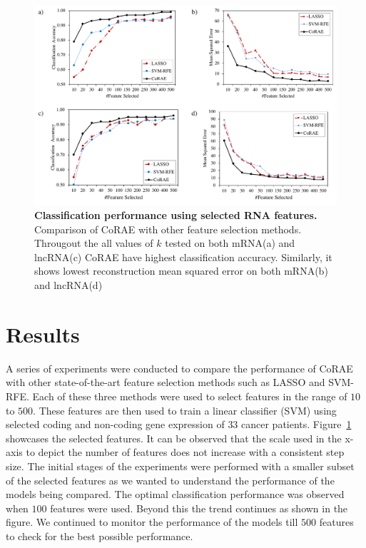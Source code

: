 \documentclass{bioinfo}
\begin{document}
\begin{figure}[bt]
    \centering
    \includegraphics[scale=0.5]{fig/acc-mse.pdf}
    \caption{\textbf{Classification performance using selected RNA features.}  Comparison of CoRAE with other feature selection methods. Througout the all values of $k$ tested on both mRNA(a) and lncRNA(c) CoRAE have highest classification accuracy. Similarly, it shows lowest reconstruction mean squared error on both mRNA(b) and lncRNA(d)}
    \label{fig:acc-mse}
\end{figure}
\section{Results}
A series of experiments were conducted to compare the performance of CoRAE with other state-of-the-art feature selection methods such as LASSO and SVM-RFE.
Each of these three methods were used to select features in the range of $10$ to $500$.
These features are then used to train a linear classifier (SVM) using selected coding and non-coding gene expression of $33$ cancer patients. 
Figure~\ref{fig:acc-mse} showcases the selected features. It can be observed that the scale used in the x-axis to depict the number of features does not increase with a consistent step size.
The initial stages of the experiments were performed with a smaller subset of the selected features as we wanted to understand the performance of the models being compared.
The optimal classification performance was observed when $100$ features were used.
Beyond this the trend continues as shown in the figure. We continued to monitor the performance of the models till $500$ features to check for the best possible performance. 
\end{document}
